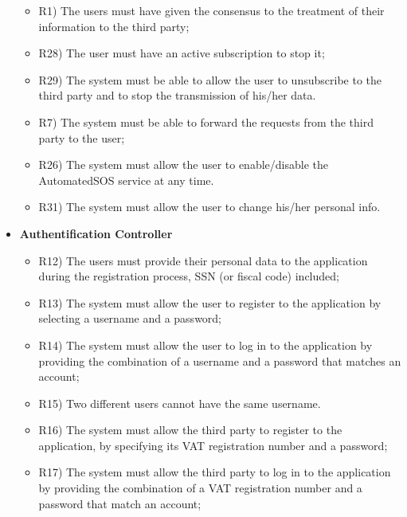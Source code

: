 \begin{itemize}
		\begin{itemize}
			\item R1) The users must have given the consensus to the treatment of their information to the third party;\\
			\item R28) The user must have an active subscription to stop it;\\
	 		\item R29) The system must be able to allow the user to unsubscribe to the third party and to stop the transmission of his/her data.\\
	 		\item R7) The system must be able to forward the requests from the third party to the user;\\
	 		\item R26) The system must allow the user to enable/disable the AutomatedSOS service at any time.\\
			\item R31) The system must allow the user to change his/her personal info.\\
		\end{itemize}
		\item \textbf{Authentification Controller}
		\begin{itemize}
			\item R12) The users must provide their personal data to the application during the registration process, SSN (or fiscal code) included;\\
			\item R13) The system must allow the user to register to the application by selecting a username and a password;\\
			\item R14) The system must allow the user to log in to the application by providing the combination of a username and a password that matches an account;\\
			\item R15) Two different users cannot have the same username.\\
			\item R16) The system must allow the third party to register to the application, by specifying its VAT registration number and a password;\\
			\item R17) The system must allow the third party to log in to the application by providing the combination of a VAT registration number and a password that match an account;\\

\end{itemize}
\end{itemize}
